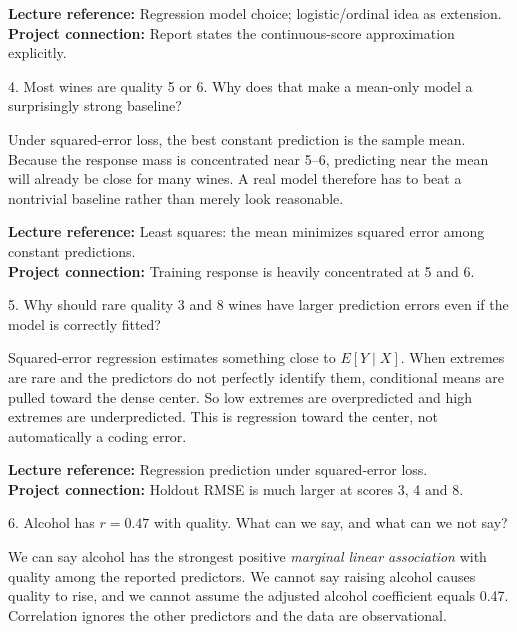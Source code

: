 \documentclass[10.5pt,a4paper]{article}
\newcommand{\chapref}[1]{\textbf{Lecture reference:} #1}
\newcommand{\projectref}[1]{\textbf{Project connection:} #1}
\begin{document}
\begin{refbox}\chapref{Regression model choice; logistic/ordinal idea as extension.}\\\projectref{Report states the continuous-score approximation explicitly.}\end{refbox}
\begin{qbox}{4. Most wines are quality 5 or 6. Why does that make a mean-only model a surprisingly strong baseline?}
\end{qbox}
\begin{answerbox}Under squared-error loss, the best constant prediction is the sample mean. Because the response mass is concentrated near 5--6, predicting near the mean will already be close for many wines. A real model therefore has to beat a nontrivial baseline rather than merely look reasonable.\end{answerbox}
\begin{refbox}\chapref{Least squares: the mean minimizes squared error among constant predictions.}\\\projectref{Training response is heavily concentrated at 5 and 6.}\end{refbox}
\begin{qbox}{5. Why should rare quality 3 and 8 wines have larger prediction errors even if the model is correctly fitted?}
\end{qbox}
\begin{answerbox}Squared-error regression estimates something close to \(E[Y\mid X]\). When extremes are rare and the predictors do not perfectly identify them, conditional means are pulled toward the dense center. So low extremes are overpredicted and high extremes are underpredicted. This is regression toward the center, not automatically a coding error.\end{answerbox}
\begin{refbox}\chapref{Regression prediction under squared-error loss.}\\\projectref{Holdout RMSE is much larger at scores 3, 4 and 8.}\end{refbox}
\begin{qbox}{6. Alcohol has $r=0.47$ with quality. What can we say, and what can we not say?}
\end{qbox}
\begin{answerbox}We can say alcohol has the strongest positive \emph{marginal linear association} with quality among the reported predictors. We cannot say raising alcohol causes quality to rise, and we cannot assume the adjusted alcohol coefficient equals 0.47. Correlation ignores the other predictors and the data are observational.\end{answerbox}
\end{document}
